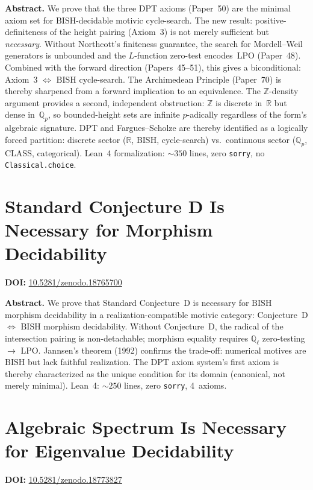 \documentclass[11pt,a4paper]{article}
\begin{document}
\bigskip
\noindent\textbf{Abstract.}
We prove that the three DPT axioms (Paper~50) are the minimal axiom set for $\mathrm{BISH}$-decidable motivic cycle-search.  The new result: positive-definiteness of the height pairing (Axiom~3) is not merely sufficient but \emph{necessary}.  Without Northcott's finiteness guarantee, the search for Mordell--Weil generators is unbounded and the $L$-function zero-test encodes~$\mathrm{LPO}$ (Paper~48).  Combined with the forward direction (Papers~45--51), this gives a biconditional: Axiom~3 $\Leftrightarrow$ $\mathrm{BISH}$ cycle-search.  The Archimedean Principle (Paper~70) is thereby sharpened from a forward implication to an equivalence.  The $\mathbb{Z}$-density argument provides a second, independent obstruction: $\mathbb{Z}$ is discrete in~$\mathbb{R}$ but dense in~$\mathbb{Q}_p$, so bounded-height sets are infinite $p$-adically regardless of the form's algebraic signature.  DPT and Fargues--Scholze are thereby identified as a logically forced partition: discrete sector ($\mathbb{R}$, BISH, cycle-search) vs.\ continuous sector ($\mathbb{Q}_p$, CLASS, categorical).  Lean~4 formalization: ${\sim}350$ lines, zero \texttt{sorry}, no \texttt{Classical.choice}.

\section{Standard Conjecture D Is Necessary for Morphism Decidability}
\label{sec:p73}
\textbf{DOI:} \href{https://doi.org/10.5281/zenodo.18765700}{10.5281/zenodo.18765700}

\bigskip
\noindent\textbf{Abstract.}
We prove that Standard Conjecture~D is necessary for $\mathrm{BISH}$ morphism decidability in a realization-compatible motivic category: Conjecture~D $\Leftrightarrow$ $\mathrm{BISH}$ morphism decidability. Without Conjecture~D, the radical of the intersection pairing is non-detachable; morphism equality requires $\mathbb{Q}_\ell$ zero-testing $\to$ $\mathrm{LPO}$. Jannsen's theorem (1992) confirms the trade-off: numerical motives are $\mathrm{BISH}$ but lack faithful realization. The DPT axiom system's first axiom is thereby characterized as the unique condition for its domain (canonical, not merely minimal). Lean~4: ${\sim}250$ lines, zero \texttt{sorry}, 4~axioms.

\section{Algebraic Spectrum Is Necessary for Eigenvalue Decidability}
\label{sec:p74}
\textbf{DOI:} \href{https://doi.org/10.5281/zenodo.18773827}{10.5281/zenodo.18773827}
\end{document}
